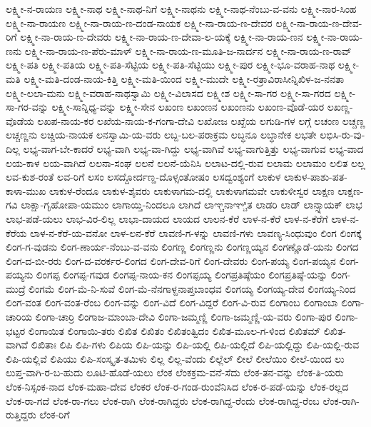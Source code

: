 ಲಕ್ಷ್ಮೀ-ನ-ರಾಯಣ
ಲಕ್ಷ್ಮೀ-ನಾಥ
ಲಕ್ಷ್ಮೀ-ನಾಥ-ನಿಗೆ
ಲಕ್ಷ್ಮೀ-ನಾಥನು
ಲಕ್ಷ್ಮೀ-ನಾಥ-ನೆಂಬು-ವ-ವನು
ಲಕ್ಷ್ಮೀ-ನಾರ-ಸಿಂಹ
ಲಕ್ಷ್ಮೀ-ನಾ-ರಾಯಣ
ಲಕ್ಷ್ಮೀ-ನಾ-ರಾಯ-ಣ-ದಂಡ-ನಾಯಕ
ಲಕ್ಷ್ಮೀ-ನಾ-ರಾಯ-ಣ-ದೇವರ
ಲಕ್ಷ್ಮೀ-ನಾ-ರಾಯ-ಣ-ದೇವ-ರಿಗೆ
ಲಕ್ಷ್ಮೀ-ನಾ-ರಾಯ-ಣ-ದೇವರು
ಲಕ್ಷ್ಮೀ-ನಾ-ರಾಯ-ಣ-ದೇವಾ-ಲ-ಯಕ್ಕೆ
ಲಕ್ಷ್ಮೀ-ನಾ-ರಾಯ-ಣನ
ಲಕ್ಷ್ಮೀ-ನಾ-ರಾಯ-ಣನು
ಲಕ್ಷ್ಮೀ-ನಾ-ರಾಯ-ಣ-ಪೆರು-ಮಾಳ್
ಲಕ್ಷ್ಮೀ-ನಾ-ರಾಯ-ಣ-ಮೂತಿ-ಜ-ನಾರ್ದನ
ಲಕ್ಷ್ಮೀ-ನಾ-ರಾಯ-ಣ-ರಾವ್
ಲಕ್ಷ್ಮೀ-ಪತಿ
ಲಕ್ಷ್ಮೀ-ಪತಿಯ
ಲಕ್ಷ್ಮೀ-ಪತಿ-ಸೆಟ್ಟಿಯ
ಲಕ್ಷ್ಮೀ-ಪತಿ-ಸೆಟ್ಟಿಯು
ಲಕ್ಷ್ಮೀ-ಪುರ
ಲಕ್ಷ್ಮೀ-ಭೂ-ವರಾಹ-ನಾಥ
ಲಕ್ಷ್ಮೀ-ಮತಿ
ಲಕ್ಷ್ಮೀ-ಮತಿ-ದಂಡ-ನಾಯ-ಕಿತ್ತಿ
ಲಕ್ಷ್ಮೀ-ಮತಿ-ಯಿಂದ
ಲಕ್ಷ್ಮೀ-ಮುದೇ
ಲಕ್ಷ್ಮೀ-ರತ್ರಾವಿರಾಸೀನ್ನಿಖಿಳ-ಜ-ನನತಾ
ಲಕ್ಷ್ಮೀ-ಲಲಾ-ಮನು
ಲಕ್ಷ್ಮೀ-ವರಾಹ-ನಾಥಸ್ವಾಮಿ
ಲಕ್ಷ್ಮೀ-ವಿಲಾಸದ
ಲಕ್ಷ್ಮೀಶ
ಲಕ್ಷ್ಮೀ-ಸಾ-ಗರ
ಲಕ್ಷ್ಮೀ-ಸಾ-ಗರದ
ಲಕ್ಷ್ಮೀ-ಸಾ-ಗರ-ವನ್ನು
ಲಕ್ಷ್ಮೀ-ಸಾನ್ನಿಧ್ಯ-ವನ್ನು
ಲಕ್ಷ್ಮೀ-ಸೇನ
ಲಖಂಣ
ಲಖಂಣನ
ಲಖಂಣನು
ಲಖಂಣ-ವೊಡೆ-ಯರ
ಲಖಣ್ಣ-ವೊಡೆಯ
ಲಖಪ-ನಾಯ-ಕರ
ಲಖೆಯ-ನಾಯ-ಕ-ಗಂಗಾ-ದೇವಿ
ಲಖೋಜ
ಲಖ್ಖೆಯ
ಲಗುಡಿ-ಗಳ
ಲಗ್ಗೆ
ಲಚಂಣ
ಲಚ್ಚಣ್ಣ
ಲಚ್ಚಣ್ಣನು
ಲಚ್ಚಿಯ-ನಾಯಕ
ಲನಸ್ವಾಮಿ-ಯ-ವರು
ಲಬ್ದ-ಬಲ-ಪರಾಕ್ರಮ
ಲಬ್ಧನೂ
ಲಬ್ಧಾನೇಕ
ಲಭತೇ
ಲಭಿಸಿ-ರು-ವು-ದಿಲ್ಲ
ಲಭ್ಯ-ವಾಗ-ಬೇ-ಕಾದರೆ
ಲಭ್ಯ-ವಾಗಿ
ಲಭ್ಯ-ವಾ-ಗಿದ್ದು
ಲಭ್ಯ-ವಾಗಿವೆ
ಲಭ್ಯ-ವಾಗುತ್ತಿತ್ತು
ಲಭ್ಯ-ವಾಗುವ
ಲಭ್ಯ-ವಾದ
ಲಯ-ಕಾಳ
ಲಯ-ವಾಗಿದೆ
ಲಲನಾ-ಸಂಘ
ಲಲನೆ
ಲಲನೆ-ಯೆನಿಸಿ
ಲಲಾಟ-ದಲ್ಲಿ-ರುವ
ಲಲಾಮ
ಲಲಾಮಂ
ಲಲಿತ
ಲಲ್ಲ
ಲವ-ಕುಶ-ರಂತೆ
ಲವ-ರಿಗೆ
ಲಸಂ
ಲಸದ್ದೋರ್ದಣ್ಡ-ದೊಳ್ಸಂತೋಷಂ
ಲಸದ್ವಂಶ್ಯಂಗೆ
ಲಾಕುಳ
ಲಾಕುಳ-ಪಾಶು-ಪತ-ಕಾಳಾ-ಮುಖ
ಲಾಕುಳ-ರೆಂದೂ
ಲಾಕುಳ-ಶೈವರು
ಲಾಕುಳಾಗಮ-ದಲ್ಲಿ
ಲಾಕುಳಾಗಮವೇ
ಲಾಕುಳೀಸ್ವರ
ಲಾಕ್ಷಣ
ಲಾಕ್ಷಣ-ಗವಿ
ಲಾಕ್ಷಾ-ಗೃಹೋಪಾ-ಯಮುಂ
ಲಾಗಾಯ್ತಿ-ನಿಂದಲೂ
ಲಾಗಿದೆ
ಲಾಞ್ಚನಾಞ್ಚಿತ
ಲಾಡರಿ
ಲಾಡ್
ಲಾನ್ಸ್ನಾಯಕ್
ಲಾಭ
ಲಾಭ-ಪಡೆ-ಯಲು
ಲಾಭ-ವಿರ-ಲಿಲ್ಲ
ಲಾಭಾ-ದಾಯದ
ಲಾಯದ
ಲಾಲನ-ಕೆರೆ
ಲಾಳ-ನ-ಕೆರೆ
ಲಾಳ-ನ-ಕೆರೆಗೆ
ಲಾಳ-ನ-ಕೆರೆಯ
ಲಾಳ-ನ-ಕೆರೆ-ಯ-ವನೋ
ಲಾಳ-ಲನ-ಕೆರೆ
ಲಾವಣಿ-ಗ-ಳನ್ನು
ಲಾವಣಿ-ಗಳು
ಲಾವಣ್ಯ-ಸಿಂಧುವುಂ
ಲಿಂಗ
ಲಿಂಗಕ್ಕೆ
ಲಿಂಗ-ಗ-ವುಡನು
ಲಿಂಗ-ಣಾರ್ಯ-ನೆಂಬು-ವ-ವನು
ಲಿಂಗಣ್ಣ
ಲಿಂಗಣ್ಣನು
ಲಿಂಗಣ್ಣಯ್ಯನ
ಲಿಂಗಣ್ಣೊಡೆ-ಯನು
ಲಿಂಗದ
ಲಿಂಗ-ದ-ಬೀ-ರರು
ಲಿಂಗ-ದ-ವರರ್ಕರ-ಲಿಂಗದ
ಲಿಂಗ-ದೇವ-ರಿಗೆ
ಲಿಂಗ-ದೇವರು
ಲಿಂಗ-ಪಯ್ಯ
ಲಿಂಗ-ಪಯ್ಯನ
ಲಿಂಗ-ಪಯ್ಯನು
ಲಿಂಗಪ್ಪ
ಲಿಂಗಪ್ಪ-ಗವುಡ
ಲಿಂಗಪ್ಪ-ನಾಯ-ಕನ
ಲಿಂಗಪ್ಪಯ್ಯ
ಲಿಂಗಪ್ರತಿಷ್ಠೆಯಂ
ಲಿಂಗಪ್ರತಿಷ್ಠೆ-ಯನ್ನು
ಲಿಂಗ-ಮುದ್ರೆ
ಲಿಂಗಮೆ
ಲಿಂಗ-ಮೆ-ನಿ-ಸುವೆ
ಲಿಂಗ-ಮೆ-ನೆನಗಾಳ್ದನಾಪ್ತಬಾಂಧವ
ಲಿಂಗಯ್ಯ
ಲಿಂಗಯ್ಯ-ದೇವ
ಲಿಂಗಯ್ಯ-ನಿಂದ
ಲಿಂಗ-ವಂತ
ಲಿಂಗ-ವಂತ-ರೆಂಬ
ಲಿಂಗ-ವನ್ನು
ಲಿಂಗ-ವಿದೆ
ಲಿಂಗ-ವಿದ್ದರೆ
ಲಿಂಗ-ವಿ-ರುವ
ಲಿಂಗಾಂಬ
ಲಿಂಗಾಂಬಾ
ಲಿಂಗಾ-ಚಾರಿಯ
ಲಿಂಗಾ-ಚಾರ್ರಿ
ಲಿಂಗಾಜ-ಮಾಂಬಾ-ದೇವಿ
ಲಿಂಗಾ-ಜಮ್ಮಣ್ಣಿ
ಲಿಂಗಾ-ಜಮ್ಮಣ್ಣಿ-ಯ-ವರು
ಲಿಂಗಾ-ಪುರ
ಲಿಂಗಾ-ಭಟ್ಟರ
ಲಿಂಗಾಯಿತ
ಲಿಂಗಾಯಿ-ತರು
ಲಿಖಿತ
ಲಿಖಿತಂ
ಲಿಖಿತಂತ್ವಿದಂ
ಲಿಖಿತ-ಮೂಲ-ಗ-ಳಿಂದ
ಲಿಖಿತಮ್
ಲಿಖಿತ-ವಾಗಿವೆ
ಲಿಖಿತಾಃ
ಲಿಪಿ
ಲಿಪಿ-ಗಳು
ಲಿಪಿಯ
ಲಿಪಿ-ಯನ್ನು
ಲಿಪಿ-ಯಲ್ಲಿ
ಲಿಪಿ-ಯಲ್ಲಿದೆ
ಲಿಪಿ-ಯಲ್ಲಿದ್ದು
ಲಿಪಿ-ಯಲ್ಲಿ-ರುವ
ಲಿಪಿ-ಯಲ್ಲಿವೆ
ಲಿಪಿಯು
ಲಿಪಿ-ಸಂಸ್ಕೃತ-ತಮಿಳು
ಲಿಲ್ಲ
ಲಿಲ್ಲ-ವೆಂದು
ಲಿಲ್ಲೆಲ್
ಲೀಲೆ
ಲೀಲೆಯಿಂ
ಲೀಲೆ-ಯಿಂದ
ಲು
ಲುಪ್ತ-ವಾಗಿ-ರ-ಬ-ಹುದು
ಲೂಟಿ-ಹೊಡೆ-ಯಲು
ಲೆಂಕ
ಲೆಂಕಕ್ರಮ-ವನೆ-ಸೆದು
ಲೆಂಕ-ತನ-ವನ್ನು
ಲೆಂಕ-ತಿ-ಯರು
ಲೆಂಕ-ನಿಸ್ಸಂಕ-ನಾದ
ಲೆಂಕ-ಮಹಾ-ದೇವ
ಲೆಂಕರ
ಲೆಂಕ-ರ-ಗಂಡ-ರುಂವೆನಿಸಿದ
ಲೆಂಕ-ರ-ಪಡೆ-ಯನ್ನು
ಲೆಂಕ-ರಲ್ಲದ
ಲೆಂಕ-ರಾ-ಗದೆ
ಲೆಂಕ-ರಾ-ಗಲು
ಲೆಂಕ-ರಾಗಿ
ಲೆಂಕ-ರಾಗಿದ್ದರು
ಲೆಂಕ-ರಾಗಿದ್ದ-ರೆಂದು
ಲೆಂಕ-ರಾಗಿದ್ದ-ರೆಂಬ
ಲೆಂಕ-ರಾಗಿ-ರುತ್ತಿದ್ದರು
ಲೆಂಕ-ರಿಗೆ
